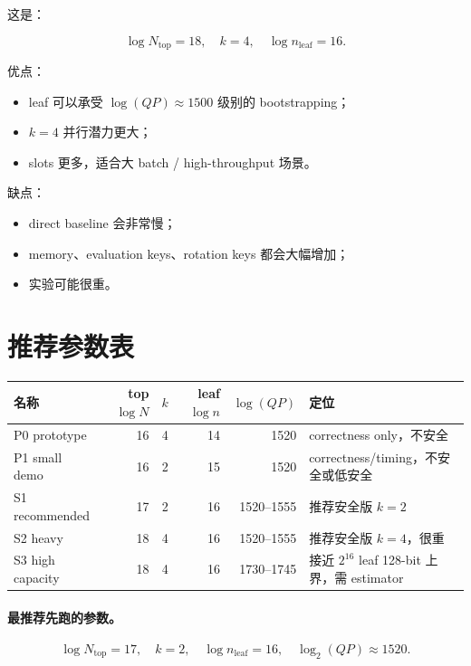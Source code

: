 \documentclass[UTF8,11pt,a4paper]{ctexart}
\begin{document}
这是：

\[
\boxed{
\log N_{\text{top}}=18,\quad k=4,\quad \log n_{\text{leaf}}=16.
}
\]

优点：
\begin{itemize}[leftmargin=2em]
    \item leaf 可以承受 $\log(QP)\approx 1500$ 级别的 bootstrapping；
    \item $k=4$ 并行潜力更大；
    \item slots 更多，适合大 batch / high-throughput 场景。
\end{itemize}

缺点：
\begin{itemize}[leftmargin=2em]
    \item direct baseline 会非常慢；
    \item memory、evaluation keys、rotation keys 都会大幅增加；
    \item 实验可能很重。
\end{itemize}

\section{推荐参数表}

\begin{center}
\begin{tabular}{lrrrrl}
\toprule
名称 & top $\log N$ & $k$ & leaf $\log n$ & $\log(QP)$ & 定位 \\
\midrule
P0 prototype & 16 & 4 & 14 & 1520 & correctness only，不安全 \\
P1 small demo & 16 & 2 & 15 & 1520 & correctness/timing，不安全或低安全 \\
S1 recommended & 17 & 2 & 16 & 1520--1555 & 推荐安全版 $k=2$ \\
S2 heavy & 18 & 4 & 16 & 1520--1555 & 推荐安全版 $k=4$，很重 \\
S3 high capacity & 18 & 4 & 16 & 1730--1745 & 接近 $2^{16}$ leaf 128-bit 上界，需 estimator \\
\bottomrule
\end{tabular}
\end{center}

\paragraph{最推荐先跑的参数。}

\[
\boxed{
\log N_{\mathrm{top}}=17,\quad
k=2,\quad
\log n_{\mathrm{leaf}}=16,\quad
\log_2(QP)\approx 1520.
}
\]
\end{document}
